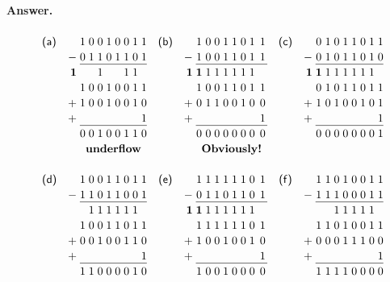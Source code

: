 \paragraph{Answer.}
\[
\renewcommand\arraystretch{0.85}
\setlength\extrarowheight{4pt}
\begin{array}{lr@{\;}c@{\;}c@{\;}c@{\;}c@{\;}c@{\;}c@{\;}c@{\;}c@{}lcr@{\;}c@{\;}c@{\;}c@{\;}c@{\;}c@{\;}c@{\;}c@{\;}c@{}lcr@{\;}c@{\;}c@{\;}c@{\;}c@{\;}c@{\;}c@{\;}c@{\;}c@{}}
\textsf{(a)} &   & 1&0&0&1&0&0&1&1 & &
\textsf{(b)} &   & 1&0&0&1&1&0&1&1 & &
\textsf{(c)} &   & 0&1&0&1&1&0&1&1\\
             & - & 0&1&1&0&1&1&0&1 & &
             & - & 1&0&0&1&1&0&1&1 & &
             & - & 0&1&0&1&1&0&1&0\\
\cline{3-10}\cline{14-21}\cline{25-32}
             & \textbf{1} &  & &1& & &1&1&  & &
             & \textbf{1} & \textbf{1}&1&1&1&1&1&1&  & &
             & \textbf{1} & \textbf{1}&1&1&1&1&1&1&\\
             &   & 1&0&0&1&0&0&1&1 & &
             &   & 1&0&0&1&1&0&1&1 & &
             &   & 0&1&0&1&1&0&1&1\\
             & + & 1&0&0&1&0&0&1&0 & &
             & + & 0&1&1&0&0&1&0&0 & &
             & + & 1&0&1&0&0&1&0&1\\
             & + &  & & & & & & &1 & &
             & + &  & & & & & & &1 & &
             & + &  & & & & & & &1\\
\cline{3-10}\cline{14-21}\cline{25-32}
             &   & 0&0&1&0&0&1&1&0 & &
             &   & 0&0&0&0&0&0&0&0 & &
             &   & 0&0&0&0&0&0&0&1\\
             &   & \multicolumn{8}{c}{\textbf{underflow}}
                                   & &
             &   & \multicolumn{8}{c}{\textbf{Obviously!}}\\\\
\textsf{(d)} &   & 1&0&0&1&1&0&1&1 & &
\textsf{(e)} &   & 1&1&1&1&1&1&0&1 & &
\textsf{(f)} &   & 1&1&0&1&0&0&1&1\\
             & - & 1&1&0&1&1&0&0&1 & &
             & - & 0&1&1&0&1&1&0&1 & &
             & - & 1&1&1&0&0&0&1&1\\
\cline{3-10}\cline{14-21}\cline{25-32}
             &   &  &1&1&1&1&1&1&  & &
             & \textbf{1} &\textbf{1} &1&1&1&1&1&1&  & &
             &   &  & &1&1&1&1&1&\\
             &   & 1&0&0&1&1&0&1&1 & &
             &   & 1&1&1&1&1&1&0&1 & &
             &   & 1&1&0&1&0&0&1&1\\
             & + & 0&0&1&0&0&1&1&0 & &
             & + & 1&0&0&1&0&0&1&0 & &
             & + & 0&0&0&1&1&1&0&0\\
             & + &  & & & & & & &1 & &
             & + &  & & & & & & &1 & &
             & + &  & & & & & & &1\\
\cline{3-10}\cline{14-21}\cline{25-32}
             &   & 1&1&0&0&0&0&1&0 & &
             &   & 1&0&0&1&0&0&0&0 & &
             &   & 1&1&1&1&0&0&0&0
\end{array}
\]

